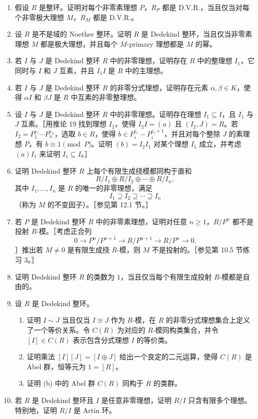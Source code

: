 \begin{enumerate}[label=\arabic*.]
  \item 假设 $R$ 是整环。证明对每个非零素理想 $P$，$R_P$ 都是 D.V.R.，当且仅当对每个非零极大理想 $M$，$R_M$ 都是 D.V.R.。
  \item 设 $R$ 是不是域的 Noether 整环。证明 $R$ 是 Dedekind 整环，当且仅当非零素理想 $M$ 都是极大理想，并且每个 $M$-primary 理想都是 $M$ 的幂。
  \item 若 $I$ 与 $J$ 是 Dedekind 整环 $R$ 中的非零理想，证明存在 $R$ 中的整理想 $I_1$，它同时与 $I$ 和 $J$ 互素，并且 $I_1I$ 是 $R$ 中的主理想。
  \item 若 $I$ 与 $J$ 是 Dedekind 整环 $R$ 的非零分式理想，证明存在元素 $\alpha,\beta\in K$，使得 $\alpha I$ 和 $\beta J$ 是 $R$ 中互素的非零整理想。
  \item 设 $I$ 与 $J$ 是 Dedekind 整环 $R$ 中的非零理想。证明存在理想 $I_1\subseteq I$，且 $I_1$ 与 $J$ 互素。［用推论 19 找到理想 $I_2$，使得 $I_2I=(a)$ 且 $(I_2,J)=R$。若 $I_2=P_1^{e_1}\cdots P_n^{e_n}$，选取 $b\in R$，使得 $b\in P_i^{e_i}-P_i^{e_i+1}$，并且对每个整除 $J$ 的素理想 $P$，有 $b\equiv1\pmod P$。证明 $(b)=I_2I_1$ 对某个理想 $I_1$ 成立，并考虑 $(a)I_1$ 来证明 $I_1\subseteq I$。］
  \item 证明 Dedekind 整环 $R$ 上每个有限生成挠模都同构于直和
  \[
    R/I_1\oplus R/I_2\oplus\cdots\oplus R/I_n,
  \]
  其中 $I_1,
  \ldots,I_n$ 是 $R$ 的唯一的非零理想，满足
  \[
    I_1\supseteq I_2\supseteq\cdots\supseteq I_n
  \]
  （称为 $M$ 的不变因子）。［参见第 12.1 节。］
  \item 若 $P$ 是 Dedekind 整环 $R$ 中的非零素理想，证明对任意 $n\geq1$，$R/P^n$ 都不是投射 $R$-模。［考虑正合列
  \[
    0\to P^n/P^{n+1}\to R/P^{n+1}\to R/P^n\to0.
  \]
  ］推出若 $M\neq0$ 是有限生成挠 $R$-模，则 $M$ 不是投射的。［参见第 10.5 节练习 3。］
  \item 证明 Dedekind 整环 $R$ 的类数为 $1$，当且仅当每个有限生成投射 $R$-模都是自由的。
  \item 设 $R$ 是 Dedekind 整环。
  \begin{enumerate}[label=(\alph*)]
    \item 证明 $I\sim J$ 当且仅当 $I\cong J$ 作为 $R$-模，在 $R$ 的非零分式理想集合上定义了一个等价关系。令 $C(R)$ 为对应的 $R$-模同构类集合，并令 $[I]\in C(R)$ 表示包含分式理想 $I$ 的等价类。
    \item 证明乘法 $[I][J]=[I\oplus J]$ 给出一个良定的二元运算，使得 $C(R)$ 是 Abel 群，恒等元为 $1=[R]$。
    \item 证明 (b) 中的 Abel 群 $C(R)$ 同构于 $R$ 的类群。
  \end{enumerate}
  \item 若 $R$ 是 Dedekind 整环且 $I$ 是任意非零理想，证明 $R/I$ 只含有限多个理想。特别地，证明 $R/I$ 是 Artin 环。

\end{enumerate}
